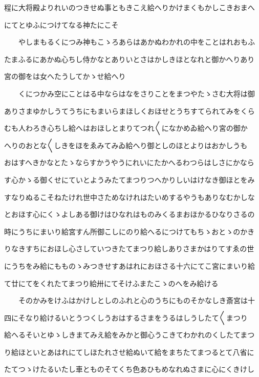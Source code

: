 \documentclass[a4paper,11pt,landscape]{ltjtarticle}
\begin{document}
程に大将殿よりれいのつきせぬ事ともきこえ給へりかけまくもかしこきおまへ
\par\medskip
にてとゆふにつけてなる神たにこそ
\par\medskip
　　やしまもるくにつみ神もこゝろあらはあかぬわかれの中をことはれおもふ
\par\medskip
たまふるにあかぬ心ちし侍かなとありいとさはかしきほとなれと御かへりあり
\par\medskip
宮の御をは女へたうしてかゝせ給へり
\par\medskip
　　くにつかみ空にことはる中ならはなをさりことをまつやたゝさむ大将は御
\par\medskip
ありさまゆかしうてうちにもまいらまほしくおほせとうちすてられてみをくら
\par\medskip
むも人わろき心ちし給へはおほしとまりてつれ〱になかめゐ給へり宮の御か
\par\medskip
へりのおとな〱しきをほをゑみてみゐ給へり御としのほとよりはおかしうも
\par\medskip
おはすへきかなとたゝならすかうやうにれいにたかへるわつらはしさにかなら
\par\medskip
す心かゝる御くせにていとようみたてまつりつへかりしいはけなき御ほとをみ
\par\medskip
すなりぬるこそねたけれ世中さためなけれはたいめするやうもありなむかしな
\par\medskip
とおほす心にくゝよしある御けはひなれはものみくるまおほかるひなりさるの
\par\medskip
時にうちにまいり給宮すん所御こしにのり給へるにつけてもちゝおとゝのかき
\par\medskip
りなきすちにおほし心さしていつきたてまつり給しありさまかはりてすゑの世
\par\medskip
にうちをみ給にもものゝみつきせすあはれにおほさる十六にてこ宮にまいり給
\par\medskip
て廿にてをくれたてまつり給卅にてそけふまたこゝのへをみ給ける
\par\medskip
　　そのかみをけふはかけしとしのふれと心のうちにものそかなしき斎宮は十
\par\medskip
四にそなり給けるいとうつくしうおはするさまをうるはしうしたて〱まつり
\par\medskip
給へるそいとゆゝしきまてみえ給をみかと御心うこきてわかれのくしたてまつ
\par\medskip
り給ほといとあはれにてしほたれさせ給ぬいて給をまちたてまつるとて八省に
\par\medskip
たてつゝけたるいたし車とものそてくち色あひもめなれぬさまに心にくきけし
\par\medskip
\end{document}
